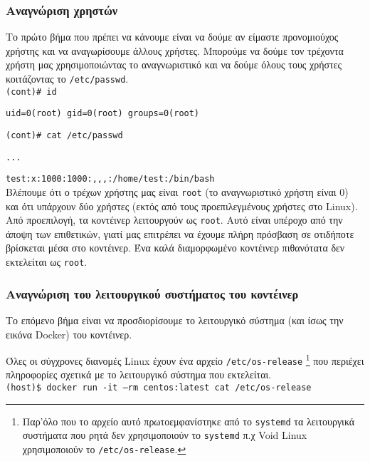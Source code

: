 \subsubsection{Αναγνώριση χρηστών}

Το πρώτο βήμα που πρέπει να κάνουμε είναι να δούμε αν είμαστε προνομιούχος
χρήστης και να αναγωρίσουμε άλλους χρήστες. Μπορούμε να δούμε τον τρέχοντα
χρήστη μας χρησιμοποιώντας το αναγνωριστικό και να δούμε όλους τους χρήστες
κοιτάζοντας το \texttt{\textlatin{/etc/passwd}}. \\

\texttt{\textlatin{(cont)\# id}}

\texttt{\textlatin{uid=0(root) gid=0(root) groups=0(root)}}

\texttt{\textlatin{(cont)\# cat /etc/passwd}}

\texttt{\textlatin{...}}

\texttt{\textlatin{test:x:1000:1000:,,,:/home/test:/bin/bash}} \\

Βλέπουμε ότι ο τρέχων χρήστης μας είναι \texttt{\textlatin{root}} (το
αναγνωριστικό χρήστη είναι 0) και ότι υπάρχουν δύο χρήστες (εκτός από τους
προεπιλεγμένους χρήστες στο \textlatin{Linux}). Από προεπιλογή, τα κοντέινερ
λειτουργούν ως \texttt{\textlatin{root}}. Αυτό είναι υπέροχο από την άποψη των
επιθετικών, γιατί μας επιτρέπει να έχουμε πλήρη πρόσβαση σε οτιδήποτε βρίσκεται
μέσα στο κοντέινερ. Ένα καλά διαμορφωμένο κοντέινερ πιθανότατα δεν εκτελείται ως
\texttt{\textlatin{root}}.

\subsubsection{Αναγνώριση του λειτουργικού συστήματος του κοντέινερ}

Το επόμενο βήμα είναι να προσδιορίσουμε το λειτουργικό σύστημα (και ίσως την
εικόνα \textlatin{Docker}) του κοντέινερ.

Όλες οι σύγχρονες διανομές \textlatin{Linux} έχουν ένα αρχείο
\texttt{\textlatin{/etc/os-release}} \footnote{Παρ'όλο που το αρχείο αυτό
πρωτοεμφανίστηκε από το \texttt{\textlatin{systemd}} τα λειτουργικά συστήματα
που ρητά δεν χρησιμοποιούν το \texttt{\textlatin{systemd}} π.χ
\textlatin{Void Linux} χρησιμοποιούν το \texttt{\textlatin{/etc/os-release}}.}
που περιέχει πληροφορίες σχετικά με το λειτουργικό σύστημα που εκτελείται. \\

\texttt{\textlatin{(host)\$ docker run -it --rm centos:latest cat /etc/os-release}}

